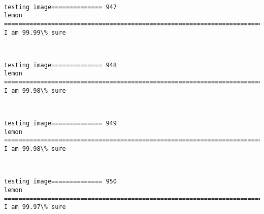 \documentclass[11pt]{article}
\begin{document}
    \begin{center}
    \end{center}
    { \hspace*{\fill} \\}
    
    \begin{Verbatim}[commandchars=\\\{\}]
testing image============== 947
lemon
============================================================================
I am 99.99\% sure

    \end{Verbatim}

    \begin{center}
    \end{center}
    { \hspace*{\fill} \\}
    
    \begin{Verbatim}[commandchars=\\\{\}]
testing image============== 948
lemon
============================================================================
I am 99.98\% sure

    \end{Verbatim}

    \begin{center}
    \end{center}
    { \hspace*{\fill} \\}
    
    \begin{Verbatim}[commandchars=\\\{\}]
testing image============== 949
lemon
============================================================================
I am 99.98\% sure

    \end{Verbatim}

    \begin{center}
    \end{center}
    { \hspace*{\fill} \\}
    
    \begin{Verbatim}[commandchars=\\\{\}]
testing image============== 950
lemon
============================================================================
I am 99.97\% sure

    \end{Verbatim}
\end{document}
